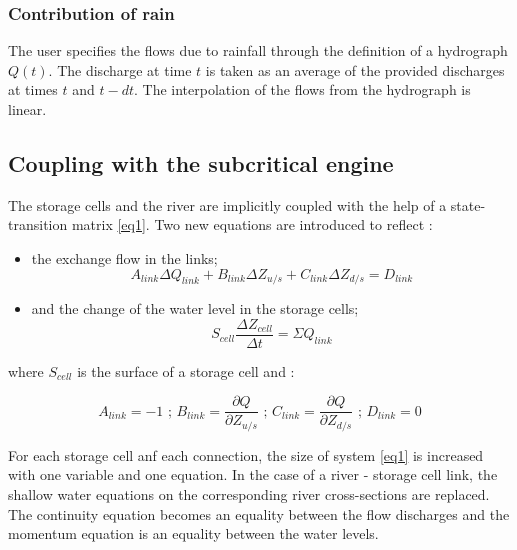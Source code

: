 \subsubsection{Contribution of rain}

The user specifies the flows due to rainfall through the definition of a hydrograph $Q(t)$. The discharge at time $t$ is taken as an average of the provided discharges at times $t$ and $t - dt$. The interpolation of the flows from the hydrograph is linear.



\subsection{Coupling with the subcritical engine}

\label{CplNyFlv}

The storage cells and the river are implicitly coupled with the help of a state-transition matrix \ref{eq1}. Two new equations are introduced to reflect :
\vspace{0.5cm}

\begin{itemize}
 \item the exchange flow in the links;
   \begin{equation}
     A_{link}\Delta Q_{link}+B_{link}\Delta Z_{u/s} + C_{link}\Delta Z_{d/s} = D_{link}
   \end{equation}
   \vspace{0.5cm}
 \item and the change of the water level in the storage cells;
    \begin{equation}
     S_{cell}\frac{\Delta Z_{cell}}{\Delta t} = \Sigma Q_{link}
   \end{equation}
\end{itemize}

\vspace{0.5cm}

where $S_{cell}$ is the surface of a storage cell and :

\begin{equation*}
 A_{link} = -1 \mbox{ ; } B_{link} = \frac{\partial Q}{\partial Z_{u/s}} \mbox{ ; }  C_{link} = \frac{\partial Q}{\partial Z_{d/s}} \mbox{ ; } D_{link} = 0
\end{equation*}


\vspace{0.5cm}

For each storage cell anf each connection, the size of system \ref{eq1} is increased with one variable and one equation. In the case of a river - storage cell link, the shallow water equations on the corresponding river cross-sections are replaced.
The continuity equation becomes an equality between the flow discharges and the momentum equation is an equality between the water levels.

